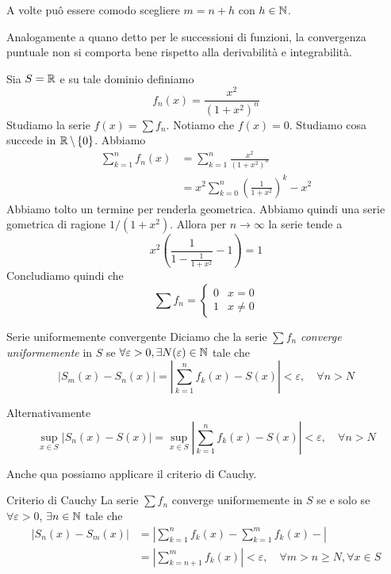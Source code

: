 \documentclass[a4paper]{article}
\begin{document}
A volte puô essere comodo scegliere \(m=n+h\) con \(h \in \mathbb{N}\).

Analogamente a quano detto per le successioni di funzioni,
la convergenza puntuale non si comporta bene rispetto alla derivabilità e integrabilità.

\begin{snippetexample}{}
    Sia \(S = \mathbb{R}\)
    e su tale dominio definiamo
    \[
        f_n(x) = \frac{x^2}{{(1 + x^2)}^n}
    \]
    Studiamo la serie \(f(x) = \sum f_n\).
    Notiamo che \(f(x) = 0\). Studiamo cosa succede in \(\mathbb{R} \,\backslash\, \{0\}\).
    Abbiamo
    \begin{align*}
        \sum_{k=1}^n f_n(x) &= \sum_{k=1}^n \frac{x^2}{{(1 + x^2)}^n} \\
        &= x^2 \sum_{k=0}^n \left(
            \frac{1}{1 + x^2}
        \right)^k - x^2
    \end{align*}
    Abbiamo tolto un termine per renderla geometrica.
    Abbiamo quindi una serie gometrica di ragione \(1 / (1 + x^2)\).
    Allora per \(n \to \infty\) la serie tende a
    \[
        x^2 \left(
            \frac{1}{1- \frac{1}{1 + x^2}} - 1
        \right) = 1
    \]
    Concludiamo quindi che
    \[
        \sum f_n = \begin{cases}
            0 & x = 0 \\
            1 & x \neq 0
        \end{cases}
    \]
\end{snippetexample}

\begin{snippetdefinition}{Serie uniformemente convergente}
    Diciamo che la serie \(\sum f_n\) \emph{converge uniformemente}
    in \(S\) se \(\forall \varepsilon > 0, \exists N(\varepsilon) \in \mathbb{N}\)
    tale che
    \[
        |S_m(x) - S_n(x)| = \left|
            \sum_{k=1}^n f_k(x) - S(x)
        \right| < \varepsilon, \quad \forall n > N
    \]
\end{snippetdefinition}

Alternativamente
\[
    \sup_{x \in S} |S_n(x) - S(x)| = \sup_{x\in S} \left|
        \sum_{k=1}^n f_k(x) - S(x)
    \right| < \varepsilon, \quad \forall n > N
\]

Anche qua possiamo applicare il criterio di Cauchy.

\begin{snippetproposition}{Criterio di Cauchy}
    La serie \(\sum f_n\) converge uniformemente in \(S\)
    se e solo se \(\forall \varepsilon > 0\), \(\exists n \in \mathbb{N}\) tale che
    \begin{align*}
        |S_n(x) - S_m(x)| &= \left|
            \sum_{k=1}^n f_k(x) - \sum_{k=1}^m f_k(x) -
        \right| \\
        &= \left|
            \sum_{k=n+1}^m f_k(x)
        \right| < \varepsilon, \quad \forall m > n \geq N, \forall x \in S
    \end{align*}
\end{snippetproposition}
\end{document}
